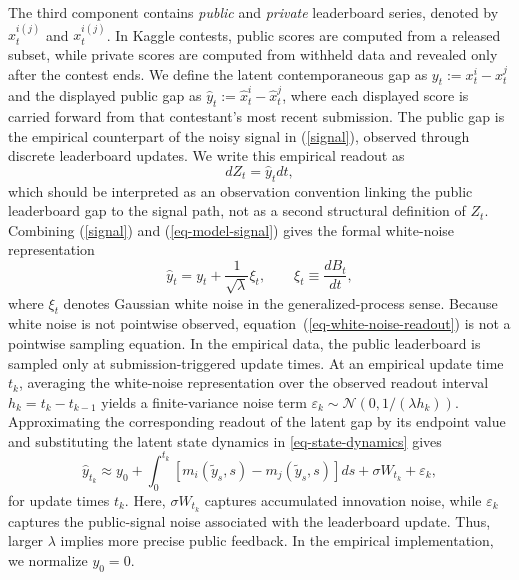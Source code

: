 \documentclass[mnsc]{informs3}
\begin{document}
The third component contains \textit{public} and \textit{private} leaderboard series, denoted by $\hat{x}^{i(j)}_t$ and $x^{i(j)}_t$.
In Kaggle contests, public scores are computed from a released subset, while private scores are computed from withheld data and revealed only after the contest ends.
We define the latent contemporaneous gap as $y_t:=x_t^i-x_t^j$ and the displayed public gap as $\hat{y}_t:=\hat{x}_t^i-\hat{x}_t^j$, where each displayed score is carried forward from that contestant's most recent submission.
The public gap is the empirical counterpart of the noisy signal in (\ref{signal}), observed through discrete leaderboard updates.
We write this empirical readout as
\begin{equation}\label{eq-model-signal}
dZ_t = \hat y_tdt,
\end{equation}
which should be interpreted as an observation convention linking the public leaderboard gap to the signal path, not as a second structural definition of $Z_t$.
Combining (\ref{signal}) and (\ref{eq-model-signal}) gives the formal white-noise representation
\begin{equation}\label{eq-white-noise-readout}
\hat y_t = y_t+\frac{1}{\sqrt{\lambda}}\xi_t,\qquad \xi_t\equiv \frac{dB_t}{dt},
\end{equation}
where $\xi_t$ denotes Gaussian white noise in the generalized-process sense.
Because white noise is not pointwise observed, equation~(\ref{eq-white-noise-readout}) is not a pointwise sampling equation.
In the empirical data, the public leaderboard is sampled only at submission-triggered update times.
At an empirical update time $t_k$, averaging the white-noise representation over the observed readout interval $h_k=t_k-t_{k-1}$ yields a finite-variance noise term $\varepsilon_k\sim\mathcal{N}(0,1/(\lambda h_k))$.
Approximating the corresponding readout of the latent gap by its endpoint value and substituting the latent state dynamics in \eqref{eq-state-dynamics} gives
\begin{equation}\label{eq-leaderboard-gap}
\hat y_{t_k}
\approx
y_0+\int_0^{t_k}\left[m_i(\tilde{y}_s,s)-m_j(\tilde{y}_s,s)\right]ds
+\sigma W_{t_k}
+\varepsilon_k,
\end{equation}
for update times $t_k$.
Here, $\sigma W_{t_k}$ captures accumulated innovation noise, while $\varepsilon_k$ captures the public-signal noise associated with the leaderboard update.
Thus, larger $\lambda$ implies more precise public feedback.
In the empirical implementation, we normalize $y_0=0$.
\end{document}
